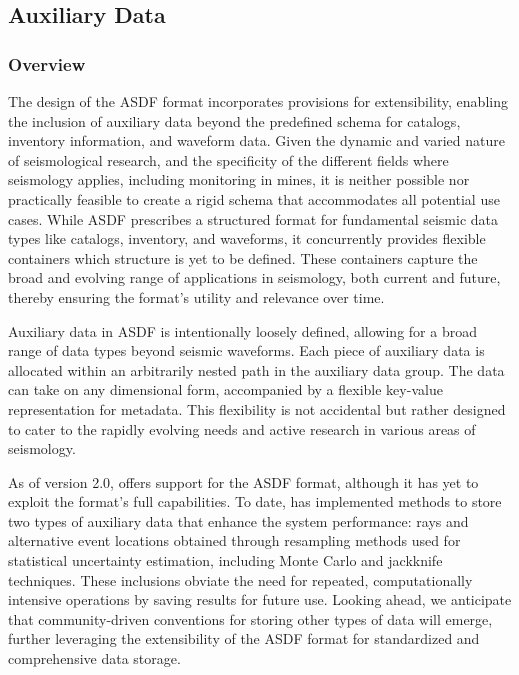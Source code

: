  
\subsection{Auxiliary Data}

\subsubsection{Overview}

The design of the ASDF format incorporates provisions for extensibility, enabling the inclusion of auxiliary data beyond the predefined schema for catalogs, inventory information, and waveform data. Given the dynamic and varied nature of seismological research, and the specificity of the different fields where seismology applies, including \museismic monitoring in mines, it is neither possible nor practically feasible to create a rigid schema that accommodates all potential use cases. While ASDF prescribes a structured format for fundamental seismic data types like catalogs, inventory, and waveforms, it concurrently provides flexible containers which structure is yet to be defined. These containers capture the broad and evolving range of applications in seismology, both current and future, thereby ensuring the format's utility and relevance over time.

Auxiliary data in ASDF is intentionally loosely defined, allowing for a broad range of data types beyond seismic waveforms. Each piece of auxiliary data is allocated within an arbitrarily nested path in the auxiliary data group. The data can take on any dimensional form, accompanied by a flexible key-value representation for metadata. This flexibility is not accidental but rather designed to cater to the rapidly evolving needs and active research in various areas of seismology.

As of version 2.0, \muquake offers support for the ASDF format, although it has yet to exploit the format's full capabilities. To date, \muquake has implemented methods to store two types of auxiliary data that enhance the system performance: rays and alternative event locations obtained through resampling methods used for statistical uncertainty estimation, including Monte Carlo and jackknife techniques. These inclusions obviate the need for repeated, computationally intensive operations by saving results for future use. Looking ahead, we anticipate that community-driven conventions for storing other types of data will emerge, further leveraging the extensibility of the ASDF format for standardized and comprehensive data storage.



